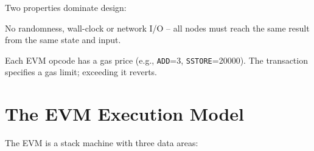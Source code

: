 Two properties dominate design:
\begin{description}[leftmargin=1.2em,style=nextline]
    \item[Determinism] No randomness, wall-clock or network I/O -- all nodes must reach the same result from the same state and input.
    \item[Gas metering] Each EVM opcode has a gas price (e.g., \texttt{ADD}=3, \texttt{SSTORE}=20000). The transaction specifies a gas limit; exceeding it reverts.
\end{description}

\section{The EVM Execution Model}\label{sec:evm}
The EVM is a stack machine with three data areas:

